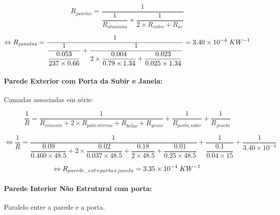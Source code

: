 \documentclass[12pt, a4paper]{article}
\begin{document}
\begin{equation}
	R_{janelas} = \dfrac{1}{\dfrac{1}{R_{aluminio}} + \dfrac{1}{2 \times R_{vidro} + R_{ar}}}
	\label{eq:zona_a_janelas}
\end{equation}

\begin{equation}
	\Leftrightarrow
	R_{janelas} =
	\dfrac{1}{
		\dfrac{1}{
			\dfrac{0.053}{237 \times 0.66}
		}+
		\dfrac{1}{
			2 \times \dfrac{0.004}{0.79 \times 1.34} +
			\dfrac{0.023}{0.025 \times 1.34}
		}
	}
		= 3.40 \times 10^{-4} \hspace{1mm} KW^{-1}
	\label{eq:zona_a_janelas2}
\end{equation}


\pagebreak
\paragraph{Parede Exterior com Porta da Subir e Janela:}\label{par:zona_a_ext}Camadas associadas em série:

\begin{equation}
    \dfrac{1}{R}=
		\dfrac{1}{
			R_{cimento} + 2 \times R_{poliestireno} + R_{bet\tilde{a}o} + R_{gesso}
		}
		+
		\dfrac{1}{
			R_{porta\_subir}
		}
		+
		\dfrac{1}{
			R_{janela}
		}
    \label{eq:zona_a_ext_1}
\end{equation}

\begin{equation}
    \Leftrightarrow \dfrac{1}{R}=
		\dfrac{1}{
			\dfrac{0.09}{0.460 \times 48.5} +
			2 \times \dfrac{0.02}{0.037 \times 48.5} +
			\dfrac{0.18}{2 \times 48.5} +
			\dfrac{0.01}{0.25 \times 48.5}
        }
		+
		\dfrac{1}{
        	\dfrac{0.1}{0.04 \times 15}
		}
		+
		\dfrac{1}{
        	3.40 \times 10^{-4}
		}
    \label{eq:zona_a_ext_2}
\end{equation}

\begin{equation}
	\Leftrightarrow R_{parede\_ext + porta + janela} = 3.35 \times 10^{-4} \hspace{1mm} KW^{-1}
	\label{eq:zona_a_ext_3}
\end{equation}

\paragraph{Parede Interior N\~ao Estrutural com porta:}\label{par:zona_a_int_n_est}Paralelo entre a parede e a porta.
\end{document}
